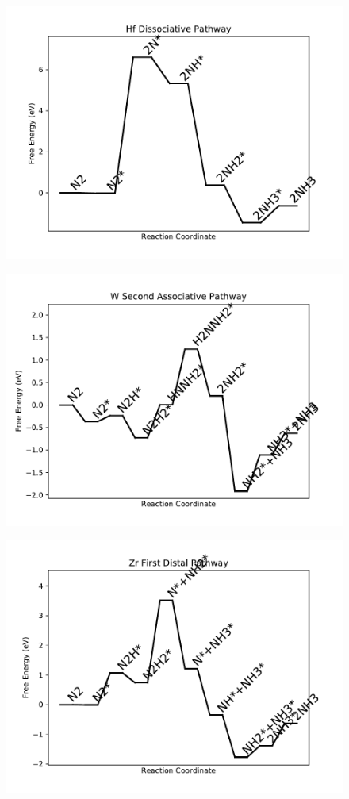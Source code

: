 \begin{figure}
\includegraphics[width=0.8\linewidth]{data/plots/Hf_dissociative.pdf}
\end{figure}

\begin{figure}
\includegraphics[width=0.8\linewidth]{data/plots/W_associative_2.pdf}
\end{figure}

\begin{figure}
\includegraphics[width=0.8\linewidth]{data/plots/Zr_distal_1.pdf}
\end{figure}

